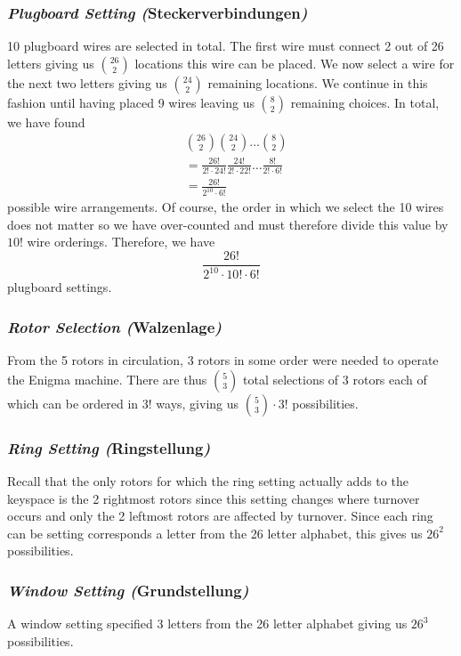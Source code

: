 \subsubsection{\emph{Plugboard Setting (}Steckerverbindungen\emph{)}}
10 plugboard wires are selected in total. The first wire must connect
2 out of 26 letters giving us ${26\choose2}$ locations this wire can
be placed. We now select a wire for the next two letters giving us
${24\choose2}$ remaining locations. We continue in this fashion until
having placed 9 wires leaving us ${8\choose2}$ remaining choices. In
total, we have found
\begin{align*}
  & {26\choose2}{24\choose2}\dots{8\choose2}                                  \\
  & =\frac{26!}{2!\cdot 24!}\frac{24!}{2!\cdot 22!}\dots\frac{8!}{2!\cdot 6!} \\
  & =\frac{26!}{2^{10}\cdot6!}
\end{align*}
possible wire arrangements. Of course, the order in which we select
the 10 wires does not matter so we have over-counted and must
therefore divide this value by $10!$ wire orderings. Therefore, we have
\[
  \frac{26!}{2^{10}\cdot 10! \cdot 6!}
\]
plugboard settings.

\subsubsection{\emph{Rotor Selection (}Walzenlage\emph{)}}
From the 5 rotors in circulation, 3 rotors in some order were needed
to operate the Enigma machine. There are thus ${5}\choose{3}$ total
selections of 3 rotors each of which can be ordered in $3!$ ways,
giving us ${5\choose3}\cdot{3!}$ possibilities.

\subsubsection{\emph{Ring Setting (}Ringstellung\emph{)}}
Recall that the only rotors for which the ring setting actually adds
to the keyspace is the 2 rightmost rotors since this setting changes
where turnover occurs and only the 2 leftmost rotors are affected by
turnover. Since each ring can be setting corresponds a letter from
the 26 letter alphabet, this gives us $26^2$ possibilities.

\subsubsection{\emph{Window Setting (}Grundstellung\emph{)}}
A window setting specified 3 letters from the 26 letter alphabet
giving us $26^3$ possibilities.

